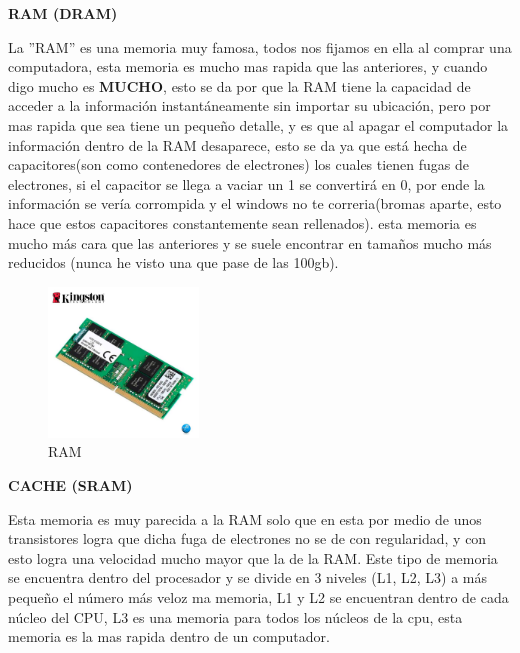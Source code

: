\documentclass{article}
\begin{document}
\vspace{3cm}
\begin{center}
    \textbf{RAM (DRAM)}
\end{center}
La ''RAM'' es una memoria muy famosa, todos nos fijamos en ella al comprar una computadora, esta memoria es mucho mas rapida que las anteriores, y cuando digo mucho es \textbf{MUCHO}, esto se da por que la RAM tiene la capacidad de acceder a la información instantáneamente sin importar su ubicación, pero por mas rapida que sea tiene un pequeño detalle, y es que al apagar el computador la información dentro de la RAM desaparece, esto se da ya que está hecha de capacitores(son como contenedores de electrones) los cuales tienen fugas de electrones, si el capacitor se llega a vaciar un 1 se convertirá en 0,  por ende la información se vería corrompida y el windows no te correria(bromas aparte, esto hace que estos capacitores constantemente sean rellenados). esta memoria es mucho más cara que las anteriores y se suele encontrar en tamaños mucho más reducidos (nunca he visto una que pase de las 100gb).\cite{pdfu}
\begin{figure}
    \centering
    \includegraphics[width=4cm]{RAM.jpg}
    \caption{RAM}
    \label{fig:my_label}
\end{figure}

\vspace{5cm}

\begin{center}
    \textbf{CACHE (SRAM)}
\end{center}

\vspace{1cm}
Esta memoria es muy parecida a la RAM solo que en esta por medio de unos transistores logra que dicha fuga de electrones no se de con regularidad, y con esto logra una velocidad mucho mayor que la de la RAM. Este tipo de memoria se encuentra dentro del procesador y se divide en 3 niveles (L1, L2, L3) a más pequeño el número más veloz ma memoria, L1 y L2 se encuentran dentro de cada núcleo del CPU, L3 es una memoria para todos los núcleos de la cpu, esta memoria es la mas rapida dentro de un computador. \cite{pdfu} 
\vspace{3cm}
\end{document}
